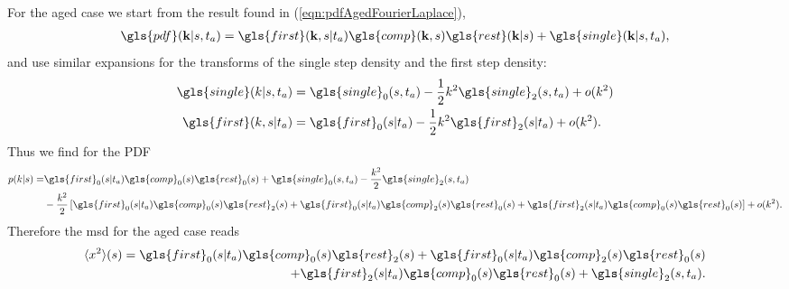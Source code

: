 For the aged case we start from the result found in (\ref{eqn:pdfAgedFourierLaplace}),
%
\begin{align}
\gls{pdf}(\ve{k}|s,t_a) =  \gls{first}(\ve{k},s|t_a)  \gls{comp}(\ve{k},s) \gls{rest}(\ve{k}|s) + \gls{single}(\ve{k}|s,t_a) ,
\end{align}
%
and use similar expansions for the transforms of the single step density and the first step density:
%
\begin{align}
\gls{single}(k|s,t_a) &= \gls{single}_0(s,t_a) - \frac{1}{2} k^2 \gls{single}_2 (s,t_a) + o(k^2)\\ 
\gls{first}(k,s|t_a) &= \gls{first}_0(s|t_a)- \frac{1}{2} k^2 \gls{first}_2(s|t_a) + o(k^2) .
\end{align}
%
Thus we find for the \gls{PDF}
%
\begin{align}
\begin{split}
 p(k|s) =& \gls{first}_0(s|t_a)\gls{comp}_0(s)\gls{rest}_0(s)  + \gls{single}_0(s,t_a) -\frac{k^2}{2}\gls{single}_2(s,t_a)    \\ 
 & - \frac{k^2}{2} \left[ \gls{first}_0(s|t_a)\gls{comp}_0(s) \gls{rest}_2(s) +\gls{first}_0(s|t_a)\gls{comp}_2(s)\gls{rest}_0(s)  + \gls{first}_2(s|t_a)\gls{comp}_0(s) \gls{rest}_0(s) \right] +o(k^2) .
\end{split}
\end{align}
%
Therefore the \gls{msd} for the aged case reads
%
\begin{align}
\begin{split}
\mean{x^2}(s) = \gls{first}_0(s|t_a)\gls{comp}_0(s) \gls{rest}_2(s) +\gls{first}_0(s|t_a)\gls{comp}_2(s)\gls{rest}_0(s)  \\
+ \gls{first}_2(s|t_a)\gls{comp}_0(s) \gls{rest}_0(s) + \gls{single}_2(s,t_a)  \label{eqn:x2Aged}.
\end{split}
\end{align}

